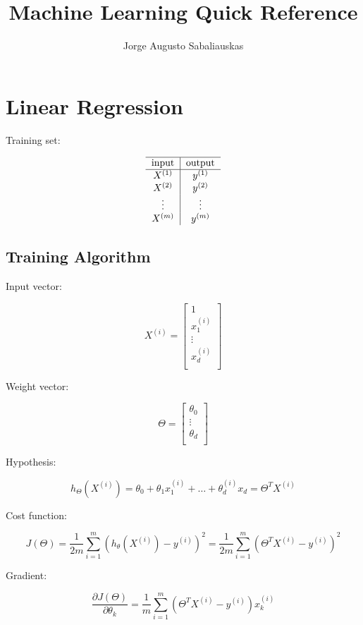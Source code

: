 \documentclass[a4, article]{article}
\author{Jorge Augusto Sabaliauskas}
\title{Machine Learning Quick Reference}
\begin{document}
\maketitle

\section{Linear Regression}

Training set:

\[
\begin{tabular}{ c | c }
\hline
input & output \\
\hline
$X^{(1)}$ & $y^{(1)}$ \\
$X^{(2)}$ & $y^{(2)}$ \\
$\vdots$ & $\vdots$ \\
$X^{(m)}$ & $y^{(m)}$ \\
\end{tabular}
\]

\subsection{Training Algorithm}

Input vector:

\[
X^{(i)} =
\left[
\begin{array}{c}
1 \\
x_{1}^{(i)} \\
\vdots \\
x_{d}^{(i)} \\
\end{array}
\right]
\]

Weight vector:

\[
\Theta =
\left[
\begin{array}{c}
\theta_0 \\
\vdots \\
\theta_d \\
\end{array}
\right]
\]

Hypothesis:

\[h_{\Theta}(X^{(i)}) = \theta_0 + \theta_1 x^{(i)}_1 + \dots + \theta^{(i)}_d x_d = \Theta^T X^{(i)}\]

Cost function:

\[J(\Theta) = \frac{1}{2 m} \sum_{i=1}^{m}(h_{\theta}(X^{(i)}) - y^{(i)})^2 = \frac{1}{2 m} \sum_{i=1}^{m}(\Theta^T X^{(i)} - y^{(i)})^2 \]

Gradient:

\[\frac{\partial J(\Theta)}{\partial \theta_k} = \frac{1}{m} \sum_{i=1}^{m}( \Theta^T X^{(i)} - y^{(i)} ) x_k ^{(i)} \]
\end{document}
